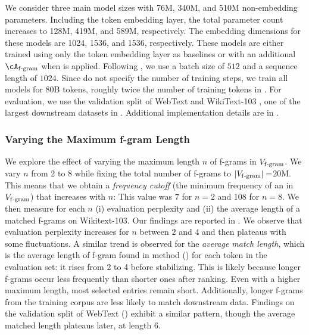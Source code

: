We consider three main model sizes with 76M, 340M, and 510M non-embedding parameters. Including the token embedding layer, the total parameter count increases to 128M, 419M, and 589M, respectively. The embedding dimensions for these models are 1024, 1536, and 1536, respectively. These models are either trained using only the token embedding layer as baselines or with an additional $\Afgram$ when \SCONE is applied.  Following \citet{radford2019language}, we use a batch size of $512$ and a sequence length of $1024$. Since \citet{radford2019language} do not specify the number of training steps, we train all models for 80B tokens, roughly twice the number of training tokens in \citet{radford2018improving}. For evaluation, we use the validation split of WebText and WikiText-103 \citep{merity2016pointer}, one of the largest downstream datasets in \citet{radford2019language}. Additional implementation details are in .



\subsubsection{Varying the Maximum f-gram Length}\label{subsec:max_ngram_size}


We explore the effect of varying the maximum length $n$ of f-grams in $V_{\mathrm{f\text{-}gram}}$. We vary $n$ from 2 to 8 while fixing the total number of f-grams to $|V_{\mathrm{f\text{-}gram}}|=$20M. This means that we obtain a {\em frequency cutoff} (the minimum frequency of an  in $V_{\mathrm{f\text{-}gram}}$) that increases with $n$: This value was $7$ for $n=2$ and 108 for $n=8$.
We then measure for each $n$ (i) evaluation perplexity and (ii) the average length of a matched f-grams on Wikitext-103. Our findings are reported in . We observe that evaluation perplexity increases for $n$ between $2$ and  $4$ and then plateaus with some fluctuations.
A similar trend is observed for the {\em average match length}, which is the average length of f-gram found in \SCONE method () for each token in the evaluation set: it rises from 2 to 4 before stabilizing. This is likely because longer f-grams occur less frequently than shorter ones after ranking. Even with a higher maximum  length, most selected entries remain short. Additionally, longer f-grams from the training corpus are less likely to match downstream data. Findings on the validation split of WebText  () exhibit a similar pattern, though the average matched length plateaus later, at length 6.


